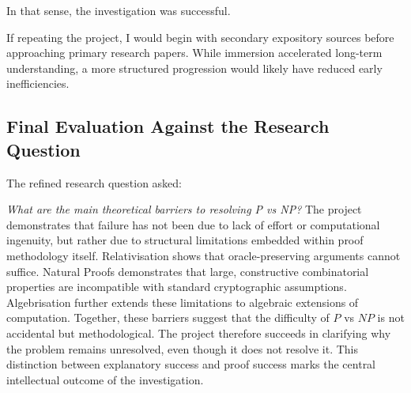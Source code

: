 \documentclass[12pt]{article}
\begin{document}
In that sense, the investigation was successful.

If repeating the project, I would begin with secondary expository sources before approaching primary research papers. While immersion accelerated long-term understanding, a more structured progression would likely have reduced early inefficiencies.

\subsection{Final Evaluation Against the Research Question}

The refined research question asked:

\textit{What are the main theoretical barriers to resolving P vs NP?}
The project demonstrates that failure has not been due to lack of effort or computational ingenuity, but rather due to structural limitations embedded within proof methodology itself.
Relativisation shows that oracle-preserving arguments cannot suffice.
Natural Proofs demonstrates that large, constructive combinatorial properties are incompatible with standard cryptographic assumptions.
Algebrisation further extends these limitations to algebraic extensions of computation.
Together, these barriers suggest that the difficulty of $P$ vs $NP$ is not accidental but methodological.
The project therefore succeeds in clarifying why the problem remains unresolved, even though it does not resolve it.
This distinction between explanatory success and proof success marks the central intellectual outcome of the investigation.
\end{document}
